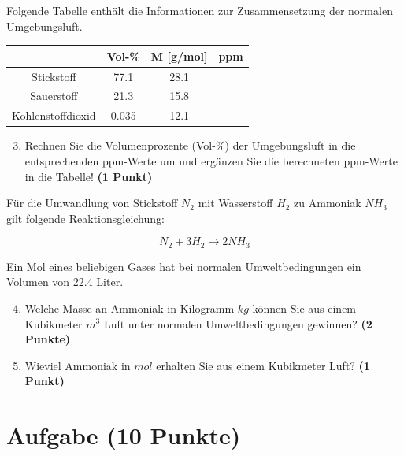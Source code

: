\documentclass[a4paper, 9pt]{scrartcl}\usepackage[]{graphicx}\usepackage[]{xcolor}
\begin{document}
Folgende Tabelle enth{\"a}lt die Informationen zur Zusammensetzung der
normalen Umgebungsluft.

\begin{center}
  \begin{tabular}{ c|c|c|c }
     & Vol-\% & M [g/mol] & ppm \\
    \hline
    Stickstoff & 77.1 & 28.1 &
                                                    \phantom{1000000000000}\strut\\
        \hline
    Sauerstoff & 21.3 & 15.8 &
                                                    \phantom{10000000}\strut\\
        \hline
    Kohlenstoffdioxid & 0.035 & 12.1 & \phantom{10000000}\strut\\     
     \hline
\end{tabular}
\end{center}

\begin{enumerate}
   \setcounter{enumi}{2}
\item Rechnen Sie die Volumenprozente (Vol-\%) der Umgebungsluft in die
  entsprechenden ppm-Werte um und erg{\"a}nzen Sie die berechneten ppm-Werte in
  die Tabelle!  \textbf{(1 Punkt)}
\end{enumerate}

F{\"u}r die Umwandlung von Stickstoff $N_2$ mit Wasserstoff $H_2$ zu Ammoniak
$NH_3$ gilt folgende Reaktionsgleichung:

\begin{equation*}
  N_2 + 3H_2 \rightarrow 2NH_3
\end{equation*}  

Ein Mol eines beliebigen Gases hat bei normalen Umweltbedingungen ein
Volumen von 22.4 Liter. %

\begin{enumerate}
  \setcounter{enumi}{3}
\item Welche Masse an Ammoniak in Kilogramm $kg$ k{\"o}nnen Sie aus einem
  Kubikmeter $m^3$ Luft unter normalen Umweltbedingungen gewinnen?
  \textbf{(2 Punkte)}
\item Wieviel Ammoniak in $mol$ erhalten Sie aus einem Kubikmeter Luft?
  \textbf{(1 Punkt)}
\end{enumerate}

 
\clearpage

\section{Aufgabe \hfill (10 Punkte)}
\end{document}
